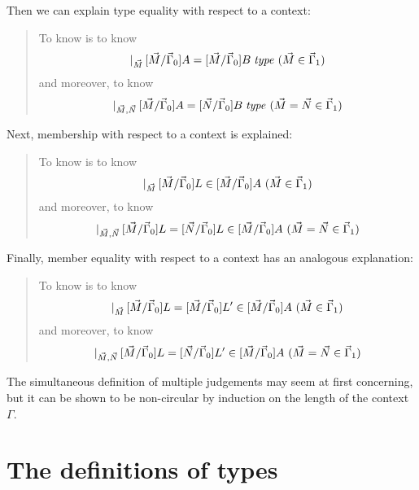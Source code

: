 \documentclass[main.tex]{subfiles}
\begin{document}
Then we can explain type equality with respect to a context:

\begin{quote}
  To know  is to know
  \[\lvert_{\vec{M}}\,[\vec{M}/\vec\Gamma_0]A=[\vec{M}/\vec\Gamma_0]B\;\mathit{type}\ (\vec{M}\in\vec\Gamma_1)\]
  and moreover, to know
  \[\lvert_{\vec{M},\vec{N}}\,[\vec{M}/\vec\Gamma_0]A =
  [\vec{N}/\vec\Gamma_0]B\;\mathit{type}\ (\vec{M}=\vec{N}\in\vec\Gamma_1)\]
\end{quote}

Next, membership with respect to a context is explained:

\begin{quote}
  To know  is to know
  \[\lvert_{\vec{M}}\,[\vec{M}/\vec\Gamma_0]L\in[\vec{M}/\vec\Gamma_0]A\ (\vec{M}\in\vec\Gamma_1)\]
  and moreover, to know
  \[\lvert_{\vec{M},\vec{N}}\,[\vec{M}/\vec\Gamma_0]L = [\vec{N}/\vec\Gamma_0]L\in[\vec{M}/\vec\Gamma_0]A\ (\vec{M}=\vec{N}\in\vec\Gamma_1)\]
\end{quote}

Finally, member equality with respect to a context has an analogous explanation:

\begin{quote}
  To know  is to know
  \[\lvert_{\vec{M}}\,[\vec{M}/\vec\Gamma_0]L=[\vec{M}/\vec\Gamma_0]L'\in[\vec{M}/\vec\Gamma_0]A\ (\vec{M}\in\vec\Gamma_1)\]
  and moreover, to know
  \[\lvert_{\vec{M},\vec{N}}\,[\vec{M}/\vec\Gamma_0]L = [\vec{N}/\vec\Gamma_0]L'\in[\vec{M}/\vec\Gamma_0]A\ (\vec{M}=\vec{N}\in\vec\Gamma_1)\]
\end{quote}

The simultaneous definition of multiple judgements may seem at first
concerning, but it can be shown to be non-circular by induction on the length
of the context $\Gamma$.

\section{The definitions of types}
\end{document}
